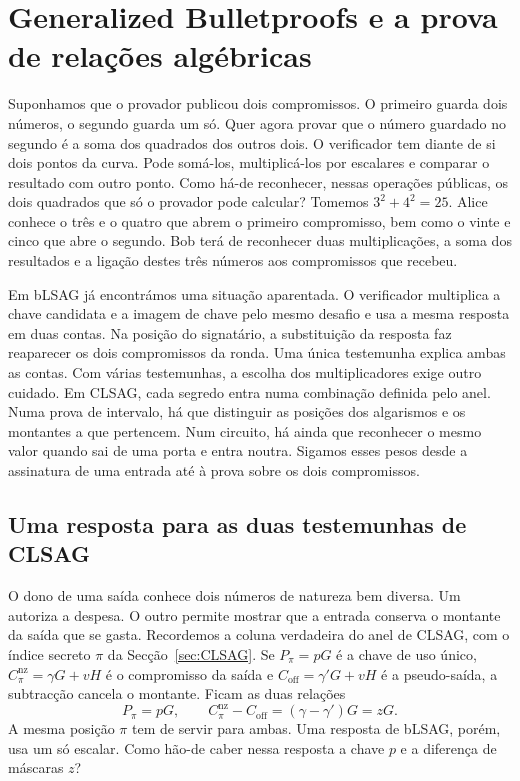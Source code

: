 \chapter{Generalized Bulletproofs e a prova de relações algébricas}
\label{chapter:generalized-bulletproofs}
\hypertarget{excerto.generalizadas.inicio}{}

Suponhamos que o provador publicou dois compromissos. O primeiro guarda
dois números, o segundo guarda um só. Quer agora provar que o número
guardado no segundo é a soma dos quadrados dos outros dois. O verificador
tem diante de si dois pontos da curva. Pode somá-los, multiplicá-los por
escalares e comparar o resultado com outro ponto. Como há-de reconhecer,
nessas operações públicas, os dois quadrados que só o provador pode calcular?
Tomemos \(3^2+4^2=25\). Alice conhece o três e o quatro que
abrem o primeiro compromisso, bem como o vinte e cinco que abre o
segundo. Bob terá de reconhecer duas multiplicações, a soma dos
resultados e a ligação destes três números aos compromissos que recebeu.

Em bLSAG já encontrámos uma situação aparentada. O verificador multiplica
a chave candidata e a imagem de chave pelo mesmo desafio e usa a mesma
resposta em duas contas.
Na posição do signatário, a substituição da resposta faz reaparecer os
dois compromissos da ronda. Uma única testemunha explica ambas as contas.
Com várias testemunhas, a escolha dos multiplicadores exige outro cuidado.
Em CLSAG, cada segredo entra numa combinação definida pelo anel. Numa prova
de intervalo, há que distinguir as posições dos algarismos e os montantes a
que pertencem. Num circuito, há ainda que reconhecer o mesmo valor quando
sai de uma porta e entra noutra. Sigamos esses pesos desde a assinatura
de uma entrada até à prova sobre os dois compromissos.

\section{Uma resposta para as duas testemunhas de CLSAG}
\label{sec:gbp-pesos-clsag}

O dono de uma saída conhece dois números de natureza bem diversa. Um
autoriza a despesa. O outro permite mostrar que a entrada conserva o
montante da saída que se gasta. Recordemos a coluna verdadeira do anel
de CLSAG, com o índice secreto \(\pi\) da Secção~\ref{sec:CLSAG}.
Se \(P_\pi=pG\) é a chave de uso único, \(C_\pi^{\mathrm{nz}}=\gamma G+vH\)
é o compromisso da saída e \(C_{\mathrm{off}}=\gamma'G+vH\) é a
pseudo-saída, a subtracção cancela o montante. Ficam as duas relações
\[
 P_\pi=pG,\qquad
 C_\pi^{\mathrm{nz}}-C_{\mathrm{off}}=(\gamma-\gamma')G=zG .
\]
A mesma posição \(\pi\) tem de servir para ambas. Uma resposta de
bLSAG, porém, usa um só escalar. Como hão-de caber nessa resposta a
chave \(p\) e a diferença de máscaras \(z\)?

